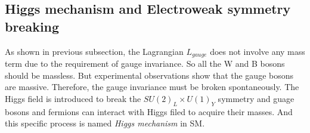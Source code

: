 \subsection{Higgs mechanism and Electroweak symmetry breaking}
\label{symbreaking}

As shown in previous subsection, the Lagrangian $L_{gauge}$ does not involve any mass term due to the requirement of gauge invariance.
So all the W and B bosons should be massless. But experimental observations show that the gauge bosons are massive.
Therefore, the gauge invariance must be broken spontaneously.
The Higgs field is introduced to break the $SU(2)_{L} \times U(1)_{Y}$ symmetry and
guage bosons and fermions can interact with Higgs filed to acquire their masses.
And this specific process is named \textit{Higgs mechanism} in SM.

